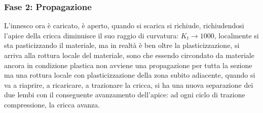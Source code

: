 \subsubsection{Fase 2: Propagazione}
		L'innesco ora è caricato, è aperto, quando si scarica si richiude, richiudendosi l'apice della cricca diminuisce il suo raggio di curvatura: $K_t\rightarrow1000$, localmente si sta pasticizzando il materiale, ma in realtà è ben oltre la plasticizzazione, si arriva  alla rottura locale del materiale, sono che essendo circondato da materiale ancora in condizione plastica non avviene una propagazione per tutta la sezione ma una rottura locale con plasticizzazione della zona subito adiacente, quando si va a riaprire, a ricaricare, a trazionare la cricca, si ha una nuova separazione dei due lembi con il conseguente avanzamento dell'apice: ad ogni ciclo di trazione compressione, la cricca avanza.

